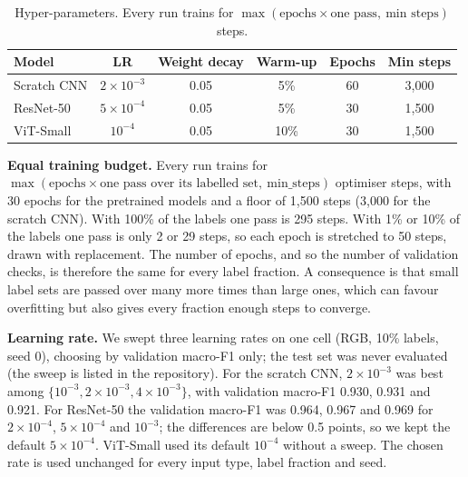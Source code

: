 \documentclass[twoside,a4paper,11pt]{article}
\begin{document}
\begin{table}[t]
\centering
\caption{Hyper-parameters. Every run trains for $\max(\text{epochs}\times\text{one pass},\ \text{min steps})$ steps.}
\label{tab:hparams}
\small
\begin{tabular}{lccccc}
\toprule
Model & LR & Weight decay & Warm-up & Epochs & Min steps \\
\midrule
Scratch CNN & $2\times10^{-3}$ & 0.05 & 5\% & 60 & 3{,}000 \\
ResNet-50 & $5\times10^{-4}$ & 0.05 & 5\% & 30 & 1{,}500 \\
ViT-Small & $10^{-4}$ & 0.05 & 10\% & 30 & 1{,}500 \\
\bottomrule
\end{tabular}
\end{table}

\textbf{Equal training budget.} Every run trains for $\max(\text{epochs}\times\text{one pass over its labelled set},\ \text{min\_steps})$ optimiser steps, with 30 epochs for the pretrained models and a floor of 1{,}500 steps (3{,}000 for the scratch CNN). With 100\% of the labels one pass is 295 steps. With 1\% or 10\% of the labels one pass is only 2 or 29 steps, so each epoch is stretched to 50 steps, drawn with replacement. The number of epochs, and so the number of validation checks, is therefore the same for every label fraction. A consequence is that small label sets are passed over many more times than large ones, which can favour overfitting but also gives every fraction enough steps to converge.

\textbf{Learning rate.} We swept three learning rates on one cell (RGB, 10\% labels, seed 0), choosing by validation macro-F1 only; the test set was never evaluated (the sweep is listed in the repository). For the scratch CNN, $2\times10^{-3}$ was best among $\{10^{-3}, 2\times10^{-3}, 4\times10^{-3}\}$, with validation macro-F1 0.930, 0.931 and 0.921. For ResNet-50 the validation macro-F1 was 0.964, 0.967 and 0.969 for $2\times10^{-4}$, $5\times10^{-4}$ and $10^{-3}$; the differences are below 0.5 points, so we kept the default $5\times10^{-4}$. ViT-Small used its default $10^{-4}$ without a sweep. The chosen rate is used unchanged for every input type, label fraction and seed.
\end{document}
